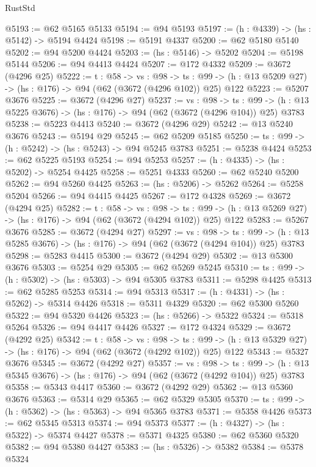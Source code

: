 \begin{lexlean}{RustStd}
\begin{coremodule}
@5193 := @62 @5165 @5133
@5194 := @94 @5193
@5197 := (h : @4339) -> (hs : @5142) -> @5194 @4424
@5198 := @5191 @4337
@5200 := @62 @5180 @5140
@5202 := @94 @5200 @4424
@5203 := (hs : @5146) -> @5202
@5204 := @5198 @5144
@5206 := @94 @4413 @4424
@5207 := @172 @4332
@5209 := @3672 (@4296 @25)
@5222 := {t : @58} ->
  {vs : @98} ->
  {ts : @99} -> (h : @13 @5209 @27) -> (hs : @176) -> @94 (@62 (@3672 (@4296 @102)) @25) @122
@5223 := @5207 @3676
@5225 := @3672 (@4296 @27)
@5237 := {vs : @98} ->
  {ts : @99} -> (h : @13 @5225 @3676) -> (hs : @176) -> @94 (@62 (@3672 (@4296 @104)) @25) @3783
@5238 := @5223 @4413
@5240 := @3672 (@4296 @29)
@5242 := @13 @5240 @3676
@5243 := @5194 @29
@5245 := @62 @5209 @5185
@5250 := {ts : @99} -> (h : @5242) -> (hs : @5243) -> @94 @5245 @3783
@5251 := @5238 @4424
@5253 := @62 @5225 @5193
@5254 := @94 @5253
@5257 := (h : @4335) -> (hs : @5202) -> @5254 @4425
@5258 := @5251 @4333
@5260 := @62 @5240 @5200
@5262 := @94 @5260 @4425
@5263 := (hs : @5206) -> @5262
@5264 := @5258 @5204
@5266 := @94 @4415 @4425
@5267 := @172 @4328
@5269 := @3672 (@4294 @25)
@5282 := {t : @58} ->
  {vs : @98} ->
  {ts : @99} -> (h : @13 @5269 @27) -> (hs : @176) -> @94 (@62 (@3672 (@4294 @102)) @25) @122
@5283 := @5267 @3676
@5285 := @3672 (@4294 @27)
@5297 := {vs : @98} ->
  {ts : @99} -> (h : @13 @5285 @3676) -> (hs : @176) -> @94 (@62 (@3672 (@4294 @104)) @25) @3783
@5298 := @5283 @4415
@5300 := @3672 (@4294 @29)
@5302 := @13 @5300 @3676
@5303 := @5254 @29
@5305 := @62 @5269 @5245
@5310 := {ts : @99} -> (h : @5302) -> (hs : @5303) -> @94 @5305 @3783
@5311 := @5298 @4425
@5313 := @62 @5285 @5253
@5314 := @94 @5313
@5317 := (h : @4331) -> (hs : @5262) -> @5314 @4426
@5318 := @5311 @4329
@5320 := @62 @5300 @5260
@5322 := @94 @5320 @4426
@5323 := (hs : @5266) -> @5322
@5324 := @5318 @5264
@5326 := @94 @4417 @4426
@5327 := @172 @4324
@5329 := @3672 (@4292 @25)
@5342 := {t : @58} ->
  {vs : @98} ->
  {ts : @99} -> (h : @13 @5329 @27) -> (hs : @176) -> @94 (@62 (@3672 (@4292 @102)) @25) @122
@5343 := @5327 @3676
@5345 := @3672 (@4292 @27)
@5357 := {vs : @98} ->
  {ts : @99} -> (h : @13 @5345 @3676) -> (hs : @176) -> @94 (@62 (@3672 (@4292 @104)) @25) @3783
@5358 := @5343 @4417
@5360 := @3672 (@4292 @29)
@5362 := @13 @5360 @3676
@5363 := @5314 @29
@5365 := @62 @5329 @5305
@5370 := {ts : @99} -> (h : @5362) -> (hs : @5363) -> @94 @5365 @3783
@5371 := @5358 @4426
@5373 := @62 @5345 @5313
@5374 := @94 @5373
@5377 := (h : @4327) -> (hs : @5322) -> @5374 @4427
@5378 := @5371 @4325
@5380 := @62 @5360 @5320
@5382 := @94 @5380 @4427
@5383 := (hs : @5326) -> @5382
@5384 := @5378 @5324

\end{coremodule}
\end{lexlean}
